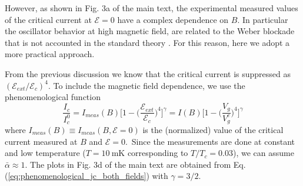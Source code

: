 \documentclass[prl,twocolumn,reprint,graphicx,showpacs,superscriptaddress,floatfix]{revtex4-1}
\newcommand{\mathE}{\mathcal{E} }
\begin{document}
However, as shown in Fig. $3$a of the main text, the experimental measured values of the critical current at $\mathE=0$ have a complex dependence on $B$.
In particular the oscillator behavior at high magnetic field, are related to the Weber blockade \cite{Morgan-Wall2015_SI} that is not accounted in the standard theory \cite{Bardeen1962_SI, Mydosh1965_SI, degennes_SI, schmidt1997physics_SI}.
For this reason, here we adopt a more practical approach.

From the previous discussion we know that the critical current is suppressed as $(\mathE_{ext}/\mathE_c)^4$.
To include the magnetic field dependence, we use the phenomenological function
\begin{equation}
 \frac{ I_c}{I_c^0 } = I_{meas}(B) \Big [ 1-  \Big( \frac{\mathE_{ext}}{\mathE_c}\Big)^4 \Big ]^\gamma =I(B) \Big [ 1-  \Big( \frac{V_g}{V_g^c}\Big)^4 \Big ]^\gamma
 \label{eq:phenomenological_jc_both_fields}
\end{equation}
where $ I_{meas}(B) \equiv I_{meas}(B, \mathE=0)$ is the (normalized) value of the critical current measured at $B$ and $\mathE=0$.\
Since the measurements are done at constant and low temperature ($T=10~$mK corresponding to $T/T_c = 0.03$), we can assume $\bar{\alpha} \approx 1$.
The plots in Fig. $3$d of the main text are obtained from Eq. (\ref{eq:phenomenological_jc_both_fields}) with $\gamma=3/2$.


\end{document}
